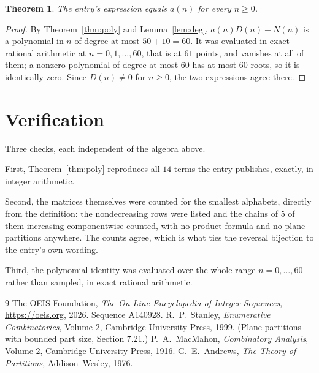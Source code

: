 \documentclass[11pt,a4paper]{article}
\theoremstyle{plain}
\newtheorem{theorem}{Theorem}
\theoremstyle{definition}
\begin{document}
\begin{theorem}
The entry's expression equals $a(n)$ for every $n\ge0$.
\end{theorem}

\begin{proof}
By Theorem~\ref{thm:poly} and Lemma~\ref{lem:deg}, $a(n)D(n)-N(n)$ is a polynomial in $n$
of degree at most $50+10=60$. It was evaluated in exact rational arithmetic at
$n=0,1,\dots,60$, that is at $61$ points, and vanishes at all of them; a nonzero polynomial
of degree at most $60$ has at most $60$ roots, so it is identically zero. Since $D(n)\neq0$
for $n\ge0$, the two expressions agree there.
\end{proof}

\section{Verification}

Three checks, each independent of the algebra above.

First, Theorem~\ref{thm:poly} reproduces all $14$ terms the entry publishes,
exactly, in integer arithmetic.

Second, the matrices themselves were counted for the smallest alphabets, directly from the
definition: the nondecreasing rows were listed and the chains of $5$ of them increasing
componentwise counted, with no product formula and no plane partitions anywhere. The counts
agree, which is what ties the reversal bijection to the entry's own wording.

Third, the polynomial identity was evaluated over the whole range $n=0,\dots,60$ rather than
sampled, in exact rational arithmetic.

\begin{thebibliography}{9}
 The OEIS Foundation, \emph{The On-Line Encyclopedia of Integer
Sequences}, \url{https://oeis.org}, 2026. Sequence A140928.
 R.~P.~Stanley, \emph{Enumerative Combinatorics}, Volume 2, Cambridge
University Press, 1999. (Plane partitions with bounded part size, Section 7.21.)
 P.~A.~MacMahon, \emph{Combinatory Analysis}, Volume 2, Cambridge
University Press, 1916.
 G.~E.~Andrews, \emph{The Theory of Partitions}, Addison--Wesley, 1976.
\end{thebibliography}
\end{document}
